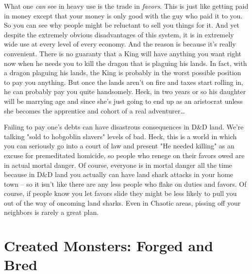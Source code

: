 What one \textit{can} see in heavy use is the trade in \textit{favors}. This is just like getting paid in money except that your money is only good with the guy who paid it to you. So you can see why people might be reluctant to sell you things for it. And yet despite the extremely obvious disadvantages of this system, it is in extremely wide use at every level of every economy. And the reason is because it's really convenient. There is no guaranty that a King will have anything you want right now when he needs you to kill the dragon that is plaguing his lands. In fact, with a dragon plaguing his lands, the King is probably in the worst possible position to pay you anything. But once the lands aren't on fire and taxes start rolling in, he can probably pay you quite handsomely. Heck, in two years or so his daughter will be marrying age and since she's just going to end up as an aristocrat unless she becomes the apprentice and cohort of a real adventurer\ldots

Failing to pay one's debts can have disastrous consequences in D\&D land. We're talking "sold to hobgoblin slavers" levels of bad. Heck, this is a world in which you can seriously go into a court of law and present "He needed killing" as an excuse for premeditated homicide, so people who renege on their favors owed are in actual mortal danger. Of course, everyone is in mortal danger all the time because in D\&D land you actually can have land shark attacks in your home town -- so it isn't like there are any less people who flake on duties and favors. Of course, if people know you let favors slide they might be less likely to pull you out of the way of oncoming land sharks. Even in Chaotic areas, pissing off your neighbors is rarely a great plan.


\section{Created Monsters: Forged and Bred}
\vspace*{-8pt}

